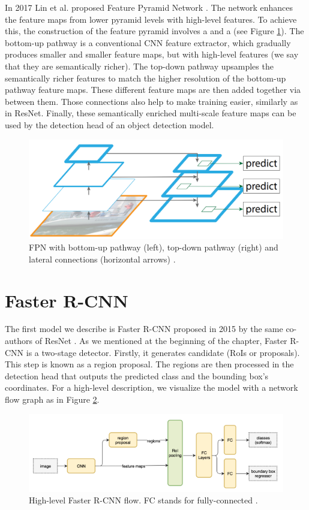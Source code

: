 In 2017 Lin et al. proposed Feature Pyramid Network \cite{fpn}. The network enhances the feature maps from lower pyramid levels with high-level features. To achieve this, the construction of the feature pyramid involves a  and a  (see Figure \ref{fig:fpn}). The bottom-up pathway is a conventional CNN feature extractor, which gradually produces smaller and smaller feature maps, but with high-level features (we say that they are semantically richer). The top-down pathway upsamples the semantically richer features to match the higher resolution of the bottom-up pathway feature maps. These different feature maps are then added together via  between them. Those connections also help to make training easier, similarly as in ResNet.  Finally, these semantically enriched multi-scale feature maps can be used by the detection head of an object detection model. 

\begin{figure}[h]
    \centering
    \includegraphics[width=0.6\linewidth]{Sources/Figures/fpn.png}
    \caption{FPN with bottom-up pathway (left), top-down pathway (right) and lateral connections (horizontal arrows) \cite{fpn}.}
    \label{fig:fpn}
\end{figure}

\section{Faster R-CNN}
The first model we describe is Faster R-CNN proposed in 2015 by the same co-authors of ResNet \cite{fasterrcnn}. As we mentioned at the beginning of the chapter, Faster R-CNN is a two-stage detector. Firstly, it generates candidate  (RoIs or proposals). This step is known as a region proposal. The regions are then processed in the detection head that outputs the predicted class and the bounding box's coordinates. For a high-level description, we visualize the model with a network flow graph as in Figure \ref{fig:fasterrcnn}. 

\begin{figure}[h]
    \centering
    \includegraphics[width=\linewidth]{Sources/Figures/fasterrcnn.png}
    \caption{High-level Faster R-CNN flow. FC stands for fully-connected \cite{huifasterrcnn}.}
    \label{fig:fasterrcnn}
\end{figure}

